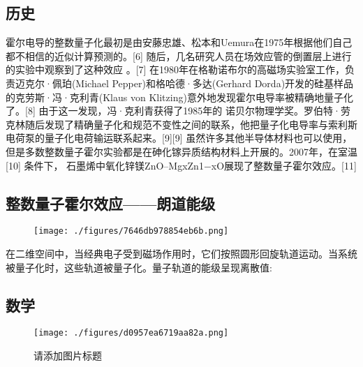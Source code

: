 \subsection{历史}
霍尔电导的整数量子化最初是由安藤忠雄、松本和Uemura在1975年根据他们自己都不相信的近似计算预测的。[6] 随后，几名研究人员在场效应管的倒置层上进行的实验中观察到了这种效应 。[7] 在1980年在格勒诺布尔的高磁场实验室工作，负责迈克尔·佩珀(Michael Pepper)和格哈德·多达(Gerhard Dorda)开发的硅基样品的克劳斯·冯·克利青(Klaus von Klitzing)意外地发现霍尔电导率被精确地量子化了。[8] 由于这一发现，冯·克利青获得了1985年的 诺贝尔物理学奖。罗伯特·劳克林随后发现了精确量子化和规范不变性之间的联系，他把量子化电导率与索利斯电荷泵的量子化电荷输运联系起来。[9][9] 虽然许多其他半导体材料也可以使用，但是多数整数量子霍尔实验都是在砷化镓异质结构材料上开展的。2007年，在室温[10] 条件下， 石墨烯中氧化锌镁ZnO–MgxZn1−xO展现了整数量子霍尔效应。[11]

\subsection{整数量子霍尔效应——朗道能级}
\begin{figure}[ht]
\centering
\texttt{[image: ./figures/7646db978854eb6b.png]}
\caption\label{fig_LZHRXY_1}
\end{figure}
在二维空间中，当经典电子受到磁场作用时，它们按照圆形回旋轨道运动。当系统被量子化时，这些轨道被量子化。量子轨道的能级呈现离散值:

\subsection{数学}
\begin{figure}[ht]
\centering
\texttt{[image: ./figures/d0957ea6719aa82a.png]}
\caption{请添加图片标题} \label{fig_LZHRXY_2}
\end{figure}
